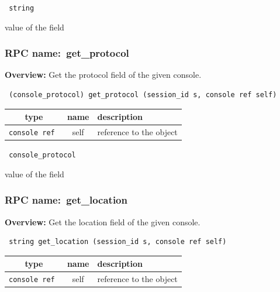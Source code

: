 \vspace{0.3cm}

{\tt 
string
}


value of the field
\vspace{0.3cm}
\vspace{0.3cm}
\vspace{0.3cm}
\subsubsection{RPC name:~get\_protocol}

{\bf Overview:} 
Get the protocol field of the given console.

\begin{verbatim} (console_protocol) get_protocol (session_id s, console ref self)\end{verbatim}



 
\vspace{0.3cm}
\begin{tabular}{|c|c|p{7cm}|}
 \hline
{\bf type} & {\bf name} & {\bf description} \\ \hline
{\tt console ref } & self & reference to the object \\ \hline 

\end{tabular}

\vspace{0.3cm}

{\tt 
console\_protocol
}


value of the field
\vspace{0.3cm}
\vspace{0.3cm}
\vspace{0.3cm}
\subsubsection{RPC name:~get\_location}

{\bf Overview:} 
Get the location field of the given console.

\begin{verbatim} string get_location (session_id s, console ref self)\end{verbatim}



 
\vspace{0.3cm}
\begin{tabular}{|c|c|p{7cm}|}
 \hline
{\bf type} & {\bf name} & {\bf description} \\ \hline
{\tt console ref } & self & reference to the object \\ \hline 

\end{tabular}

